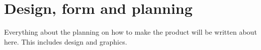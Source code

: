 \chapter{Design, form and planning}

Everything about the planning on how to make the product will be written about here. This includes design and graphics.  